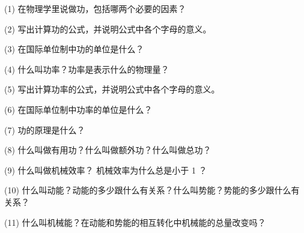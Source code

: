\label{sec:8-fuxi}

(1) 在物理学里说做功，包括哪两个必要的因素？

(2) 写出计算功的公式，并说明公式中各个字母的意义。

(3) 在国际单位制中功的单位是什么？

(4) 什么叫功率？功率是表示什么的物理量？

(5) 写出计算功率的公式，并说明公式中各个字母的意义。

(6) 在国际单位制中功率的单位是什么？

(7) 功的原理是什么？

(8) 什么叫做有用功？什么叫做额外功？什么叫做总功？

(9) 什么叫做机械效率？ 机械效率为什么总是小于 1 ？

(10) 什么叫动能？动能的多少跟什么有关系？什么叫势能？势能的多少跟什么有关系？

(11) 什么叫机械能？在动能和势能的相互转化中机械能的总量改变吗？


